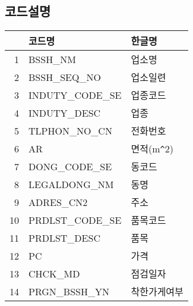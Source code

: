 \documentclass[11pt]{article}\usepackage{graphicx, color}
\begin{document}
\subsection{코드설명}
\begin{table}[ht]
\begin{center}
\begin{tabular}{rll}
  \hline
 & 코드명 & 한글명 \\ 
  \hline
1 & BSSH\_NM & 업소명 \\ 
  2 & BSSH\_SEQ\_NO & 업소일련 \\ 
  3 & INDUTY\_CODE\_SE & 업종코드 \\ 
  4 & INDUTY\_DESC & 업종 \\ 
  5 & TLPHON\_NO\_CN & 전화번호 \\ 
  6 & AR & 면적(m\verb|^|2) \\ 
  7 & DONG\_CODE\_SE & 동코드 \\ 
  8 & LEGALDONG\_NM & 동명 \\ 
  9 & ADRES\_CN2 & 주소 \\ 
  10 & PRDLST\_CODE\_SE & 품목코드 \\ 
  11 & PRDLST\_DESC & 품목 \\ 
  12 & PC & 가격 \\ 
  13 & CHCK\_MD & 점검일자 \\ 
  14 & PRGN\_BSSH\_YN & 착한가게여부 \\ 
   \hline
\end{tabular}
\end{center}
\end{table}










\newpage

\end{document}
